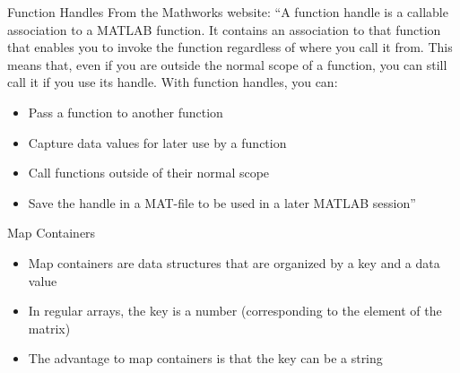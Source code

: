 \documentclass[english,xcolor=dvipsnames]{beamer}
\begin{document}
\begin{frame}{Function Handles}
From the Mathworks website:
{}``A function handle is a callable association to a MATLAB function.
It contains an association to that function that enables you to invoke
the function regardless of where you call it from. This means that,
even if you are outside the normal scope of a function, you can still
call it if you use its handle.
With function handles, you can:
\begin{itemize}
\item Pass a function to another function
\item Capture data values for later use by a function
\item Call functions outside of their normal scope
\item Save the handle in a MAT-file to be used in a later MATLAB session''
\end{itemize}
\end{frame}


\begin{frame}{Map Containers}
\begin{itemize}
\item Map containers are data structures that are organized by a key and
a data value
\item In regular arrays, the key is a number (corresponding to the element
of the matrix)
\item The advantage to map containers is that the key can be a string
\end{itemize}
\end{frame}
\end{document}

